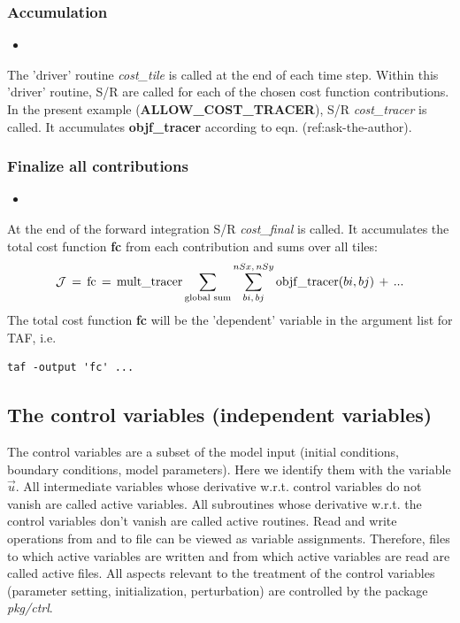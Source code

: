 \subsubsection{Accumulation}
%
\begin{itemize}
%
\item 
{}
\end{itemize}
%
The 'driver' routine
{\it cost\_tile} is called at the end of each time step.
Within this 'driver' routine, S/R are called for each of
the chosen cost function contributions.
In the present example ({\bf ALLOW\_COST\_TRACER}),
S/R {\it cost\_tracer} is called.
It accumulates {\bf objf\_tracer} according to eqn. (ref:ask-the-author).
%
\subsubsection{Finalize all contributions}
%
\begin{itemize}
%
\item 
{}
\end{itemize}
%
At the end of the forward integration S/R {\it cost\_final}
is called. It accumulates the total cost function {\bf fc}
from each contribution and sums over all tiles:
\begin{equation}
{\cal J} \, = \, 
{\rm fc} \, = \, 
{\rm mult\_tracer} \sum_{\text{global sum}} \sum_{bi,\,bj}^{nSx,\,nSy}
{\rm objf\_tracer}(bi,bj) \, + \, ...
\end{equation}
%
The total cost function {\bf fc} will be the
'dependent' variable in the argument list for TAF, i.e.
\begin{verbatim}
taf -output 'fc' ...
\end{verbatim}




\subsection{The control variables (independent variables)
\label{section_ctrl}}

The control variables are a subset of the model input
(initial conditions, boundary conditions, model parameters).
Here we identify them with the variable $ \vec{u} $.
All intermediate variables whose derivative w.r.t. control
variables do not vanish are called {\sf active variables}.
All subroutines whose derivative w.r.t. the control variables
don't vanish are called {\sf active routines}.
Read and write operations from and to file can be viewed
as variable assignments. Therefore, files to which
active variables are written and from which active variables
are read are called {\sf active files}.
All aspects relevant to the treatment of the control variables
(parameter setting, initialization, perturbation)
are controlled by the package {\it pkg/ctrl}.

